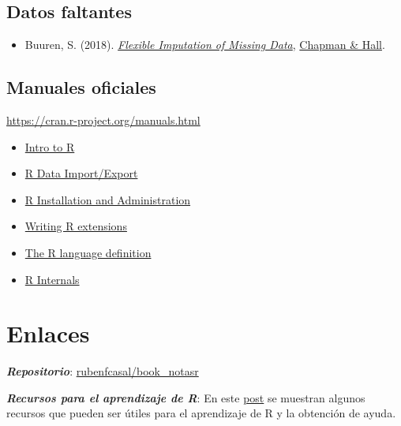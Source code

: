 \documentclass[
]{book}
\providecommand{\tightlist}{%
  \setlength{\itemsep}{0pt}\setlength{\parskip}{0pt}}
\theoremstyle{break}
\theoremstyle{nonumberplain}
\begin{document}
\hypertarget{datos-faltantes}{%
\subsection*{Datos faltantes}\label{datos-faltantes}}

\begin{itemize}
\tightlist
\item
  Buuren, S. (2018). \emph{\href{https://stefvanbuuren.name/fimd}{Flexible Imputation of Missing Data}}, \href{}{Chapman \& Hall}.
\end{itemize}

\hypertarget{manuales-oficiales}{%
\subsection*{Manuales oficiales}\label{manuales-oficiales}}

\url{https://cran.r-project.org/manuals.html}

\begin{itemize}
\item
  \href{http://colinfay.me/intro-to-r/}{Intro to R}
\item
  \href{http://colinfay.me/r-data-import-export/}{R Data Import/Export}
\item
  \href{http://colinfay.me/r-installation-administration/}{R Installation and Administration}
\item
  \href{http://colinfay.me/writing-r-extensions/}{Writing R extensions}
\item
  \href{http://colinfay.me/r-language-definition/}{The R language definition}
\item
  \href{http://colinfay.me/r-internals/}{R Internals}
\end{itemize}

\hypertarget{links}{%
\section*{Enlaces}\label{links}}

\textbf{\emph{Repositorio}}: \href{https://github.com/rubenfcasal/book_notasr}{rubenfcasal/book\_notasr}

\textbf{\emph{Recursos para el aprendizaje de R}}: En este \href{https://rubenfcasal.github.io/post/ayuda-y-recursos-para-el-aprendizaje-de-r}{post} se muestran algunos recursos que pueden ser útiles para el aprendizaje de R y la obtención de ayuda.
\end{document}
